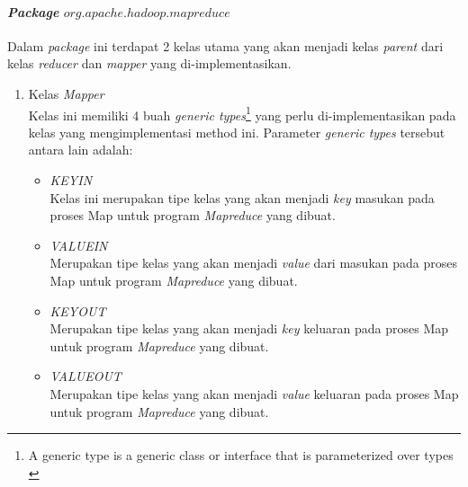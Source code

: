\paragraph{\textit{Package} $org.apache.hadoop.mapreduce$}
Dalam \textit{package} ini terdapat 2 kelas utama yang akan menjadi kelas \textit{parent} dari kelas \textit{reducer} dan \textit{mapper} yang di-implementasikan.
\begin{enumerate}
	\item{Kelas \textit{Mapper}}\\
	Kelas ini memiliki 4 buah \textit{generic types}\footnote{A generic type is a generic class or interface that is parameterized over types \cite{GenericTypeJavaOracle}} yang perlu di-implementasikan pada kelas yang mengimplementasi method ini. Parameter \textit{generic types} tersebut antara lain adalah:
	\begin{itemize}
		\item{\textit{KEYIN}}\\
		Kelas ini merupakan tipe kelas yang akan menjadi \textit{key} masukan pada proses Map untuk program \textit{Mapreduce} yang dibuat.		
		\item{\textit{VALUEIN}}\\
		Merupakan tipe kelas yang akan menjadi \textit{value} dari masukan pada proses Map untuk program \textit{Mapreduce} yang dibuat.
		\item{\textit{KEYOUT}}\\
		Merupakan tipe kelas yang akan menjadi \textit{key} keluaran pada proses Map untuk program \textit{Mapreduce} yang dibuat.
		\item{\textit{VALUEOUT}}\\
		Merupakan tipe kelas yang akan menjadi \textit{value} keluaran pada proses Map untuk program \textit{Mapreduce} yang dibuat.
	\end{itemize}
	

\end{enumerate}
